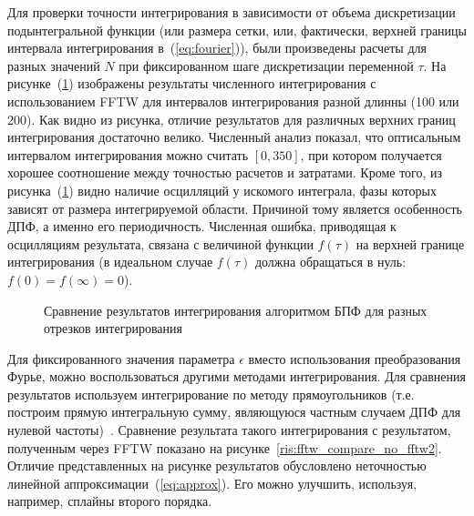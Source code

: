 \documentclass[14pt, a4paper]{article}
\numberwithin{figure}{section}
\numberwithin{equation}{section}
\begin{document}
Для проверки точности интегрирования в зависимости от объема дискретизации подынтегральной функции (или размера сетки, или, фактически, верхней границы интервала интегрирования в~(\ref{eq:fourier})), были произведены расчеты для разных значений $N$ при фиксированном шаге дискретизации переменной $\tau$. На рисунке~(\ref{ris:fftw_compare}) изображены результаты численного интегрирования с использованием FFTW для интервалов интегрирования  разной длинны (100 или 200). 
Как видно из рисунка, отличие результатов для различных верхних границ интегрирования достаточно велико. Численный анализ показал, что оптисальным интервалом интегрирования можно считать $[0, 350]$, при котором получается хорошее соотношение между точностью расчетов и затратами.
Кроме того, из рисунка~(\ref{ris:fftw_compare}) видно наличие осцилляций у искомого интеграла, фазы которых зависят от размера интегрируемой области. Причиной тому является особенность ДПФ, а именно его периодичность. Численная ошибка, приводящая к осцилляциям результата, связана с величиной функции $f(\tau)$ на верхней границе интегрирования (в идеальном случае $f(\tau)$ должна обращаться в нуль: $f(0)=f(\infty)=0$).

\begin{figure}[h]
	\caption{Сравнение результатов интегрирования алгоритмом БПФ для разных отрезков интегрирования}
	\label{ris:fftw_compare}
\end{figure}

Для фиксированного значения параметра $\epsilon$ вместо использования преобразования Фурье, можно воспользоваться другими методами интегрирования. Для сравнения результатов используем интегрирование по методу прямоугольников (т.е. построим прямую интегральную сумму, являющуюся частным случаем ДПФ для нулевой частоты)~\cite{nrc}. Сравнение результата такого интегрирования с результатом, полученным через FFTW показано на 
рисунке~\ref{ris:fftw_compare_no_fftw2}. Отличие представленных на рисунке результатов обусловлено неточностью линейной аппроксимации~(\ref{eq:approx}). Его можно улучшить, используя, например, сплайны второго порядка.
\end{document}
